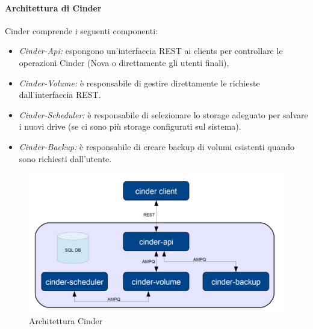 \documentclass{article}
\begin{document}
\paragraph{Architettura di Cinder}
Cinder comprende i seguenti componenti:
\begin{itemize}
    \item \textit{Cinder-Api:} espongono un'interfaccia REST ai clients per controllare le operazioni Cinder (Nova o direttamente gli utenti finali),
    \item \textit{Cinder-Volume:} è responsabile di gestire direttamente le richieste dall'interfaccia REST.
    \item \textit{Cinder-Scheduler:} è responsabile di selezionare lo storage adeguato per salvare i nuovi drive (se ci sono più storage configurati sul sistema).
    \item \textit{Cinder-Backup:} è responsabile di creare backup di volumi esistenti quando sono richiesti dall'utente.
\end{itemize}
\begin{figure}[H]
    \centering
    \includegraphics[scale=0.4]{img/Architettura Cinder.png}
    \caption{Architettura Cinder}
\end{figure}\noindent
\end{document}
